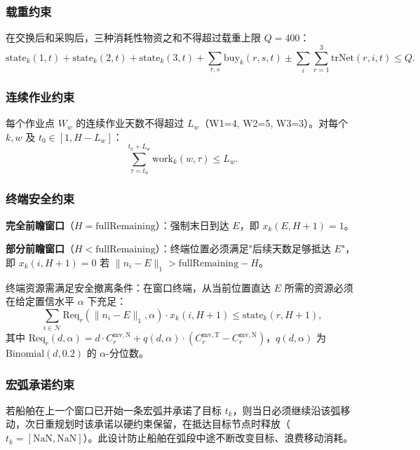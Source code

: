 \subsubsection{载重约束}

在交换后和采购后，三种消耗性物资之和不得超过载重上限 $Q=400$：
\begin{equation}\label{eq:q4_load}
\text{state}_k(1,t) + \text{state}_k(2,t) + \text{state}_k(3,t) + \sum_{r,s}\text{buy}_k(r,s,t) \pm \sum_i\sum_{r=1}^3 \text{trNet}(r,i,t) \leq Q.
\end{equation}

\subsubsection{连续作业约束}

每个作业点 $W_w$ 的连续作业天数不得超过 $L_w$（W1=4, W2=5, W3=3）。对每个 $k,w$ 及 $t_0\in[1,H-L_w]$：
\begin{equation}
\sum_{\tau=t_0}^{t_0+L_w} \text{work}_k(w,\tau) \leq L_w.
\end{equation}

\subsubsection{终端安全约束}

\textbf{完全前瞻窗口}（$H=\text{fullRemaining}$）：强制末日到达 $E$，即 $x_k(E,H+1)=1$。

\textbf{部分前瞻窗口}（$H<\text{fullRemaining}$）：终端位置必须满足"后续天数足够抵达 $E$"，即 $x_k(i,H+1)=0$ 若 $\|n_i-E\|_1 > \text{fullRemaining}-H$。

终端资源需满足安全撤离条件：在窗口终端，从当前位置直达 $E$ 所需的资源必须在给定置信水平 $\alpha$ 下充足：
\begin{equation}
\sum_{i\in\mathcal{N}} \mathrm{Req}_r(\|n_i-E\|_1, \alpha)\cdot x_k(i,H+1) \leq \text{state}_k(r, H+1),
\end{equation}
其中 $\mathrm{Req}_r(d,\alpha)=d\cdot C_r^{\mathrm{mv,N}} + q(d,\alpha)\cdot (C_r^{\mathrm{mv,T}}-C_r^{\mathrm{mv,N}})$，$q(d,\alpha)$ 为 $\mathrm{Binomial}(d,0.2)$ 的 $\alpha$-分位数。

\subsubsection{宏弧承诺约束}

若船舶在上一个窗口已开始一条宏弧并承诺了目标 $t_k$，则当日必须继续沿该弧移动，次日重规划时该承诺以硬约束保留，在抵达目标节点时释放（$t_k=[\text{NaN},\text{NaN}]$）。此设计防止船舶在弧段中途不断改变目标、浪费移动消耗。

